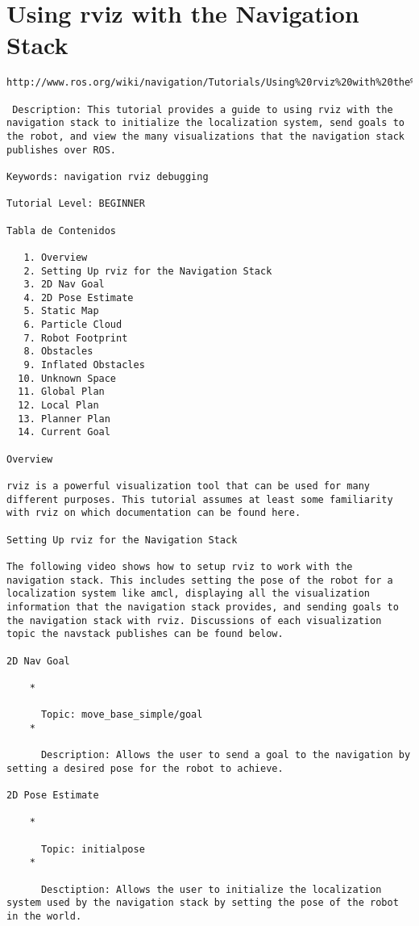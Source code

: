 \chapter{Using rviz with the Navigation Stack}

\begin{verbatim}
http://www.ros.org/wiki/navigation/Tutorials/Using%20rviz%20with%20the%20Navigation%20Stack

 Description: This tutorial provides a guide to using rviz with the navigation stack to initialize the localization system, send goals to the robot, and view the many visualizations that the navigation stack publishes over ROS.

Keywords: navigation rviz debugging

Tutorial Level: BEGINNER

Tabla de Contenidos

   1. Overview
   2. Setting Up rviz for the Navigation Stack
   3. 2D Nav Goal
   4. 2D Pose Estimate
   5. Static Map
   6. Particle Cloud
   7. Robot Footprint
   8. Obstacles
   9. Inflated Obstacles
  10. Unknown Space
  11. Global Plan
  12. Local Plan
  13. Planner Plan
  14. Current Goal

Overview

rviz is a powerful visualization tool that can be used for many different purposes. This tutorial assumes at least some familiarity with rviz on which documentation can be found here.

Setting Up rviz for the Navigation Stack

The following video shows how to setup rviz to work with the navigation stack. This includes setting the pose of the robot for a localization system like amcl, displaying all the visualization information that the navigation stack provides, and sending goals to the navigation stack with rviz. Discussions of each visualization topic the navstack publishes can be found below.

2D Nav Goal

    *

      Topic: move_base_simple/goal
    *

      Description: Allows the user to send a goal to the navigation by setting a desired pose for the robot to achieve. 

2D Pose Estimate

    *

      Topic: initialpose
    *

      Desctiption: Allows the user to initialize the localization system used by the navigation stack by setting the pose of the robot in the world. 


\end{verbatim}
